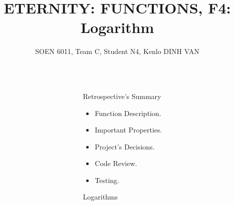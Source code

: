 \documentclass[final]{beamer}
\title{ETERNITY: FUNCTIONS, F4: Logarithm} %
\author{SOEN 6011, Team C, Student N4, Kenlo DINH VAN} %
\institute{August, 12\superscript{th} ,2019} %
\newlength{\sepwid}
\newlength{\onecolwid}
\begin{document}

\setlength{\belowcaptionskip}{2ex} %
\setlength\belowdisplayshortskip{2ex} %

\begin{frame}[t] %

\begin{columns}[t] %

\begin{column}{\sepwid}\end{column} %

\begin{column}{\onecolwid} %


\begin{alertblock}{Retrospective's Summary}
\begin{itemize}
\item Function Description.
\item Important Properties.
\item Project's Decisions.
\item Code Review.
\item Testing.
\end{itemize}

\end{alertblock}


\begin{block}{Logarithms}


\end{block}
\end{column}
\end{columns}
\end{frame}
\end{document}
